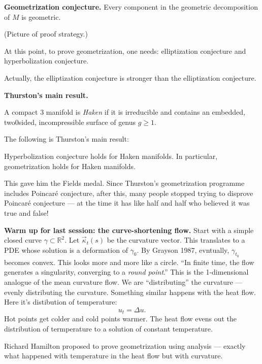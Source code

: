 \medskip\noindent
{\bf Geometrization conjecture.}
Every component in the geometric
decomposition of $M$ is geometric.

(Picture of proof strategy.)

At this point, to prove geometrization, one
needs: elliptization conjecture and
hyperbolization conjecture.

Actually, the elliptization conjecture
is stronger than the elliptization
conjecture.

\medskip\noindent
{\bf Thurston's main result.}

\begin{definition}
\label{definition-haken}
A compact 3 manifold is {\it Haken} if it is
irreducible and contains an embedded,
two0sided, incompressible surface of genus
$g \geq 1$.
\end{definition}

\noindent
The following is Thurston's main result:

\begin{theorem}[Thurston]
\label{theorem-thurston-hyperbolization}
Hyperbolization conjecture holds for Haken
manifolds. In particular, geometrization
holds for Haken manifolds.
\end{theorem}

\noindent
This gave him the Fields medal. Since
Thurston's geometrization programme
includes Poincaré conjecture, after this,
many people stopped trying to disprove
Poincaré conjecture --- at the time it has
like half and half who believed it was true
and false!

\medskip\noindent
{\bf Warm up for last session: the
curve-shortening flow.}
Start with a simple closed curve
$\gamma \subset \mathbb{R}^2$.
Let $\vec{\kappa}_t(s)$ be the curvature vector.
This translates to a PDE whose solution
is a deformation of $\gamma_0$.
By Grayson 1987, evntually, $\gamma_{t_0}$
becomes convex.
This looks more and more like a circle.
``In finite time, the flow generates a
singularity, converging to a {\it round
point}.''
This is the 1-dimensional analogue of the
mean curvature flow. We are ``distributing''
the curvature --- evenly distributing the
curvature.
Something similar happens with the heat
flow. Here it's distibution of temperature:
$$
u_t = \Delta u.
$$
Hot points get colder and cold points
warmer. The heat flow evens out the
distribution of termperature to a solution
of constant temperature.

Richard Hamilton proposed to prove
geometrization using analysis --- exactly
what happened with temperature in the heat
flow but with curvature.

